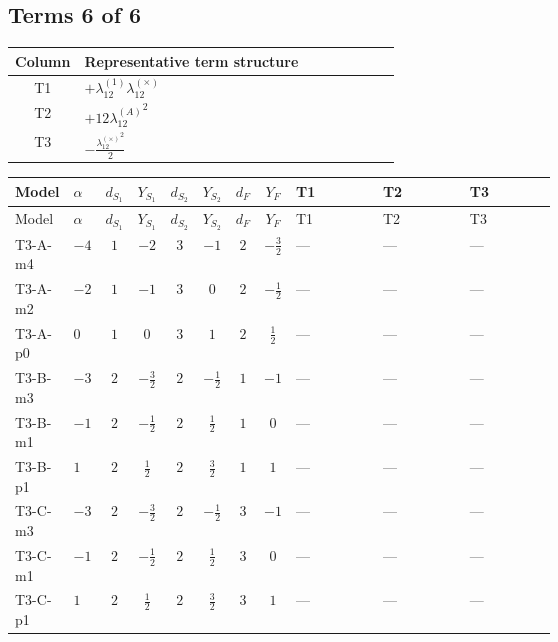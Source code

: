 \documentclass[8pt]{article}
\begin{document}
\begin{landscape}
\subsection*{Terms 6 of 6}
\begin{center}
\begin{tabular}{@{}c >{\raggedright\arraybackslash}p{0.82\linewidth}@{}}
\toprule
Column & Representative term structure \\
\midrule
T1 & \(\displaystyle +{\lambda_{12}^{(1)}} {\lambda_{12}^{(\times)}}\) \\
\midrule
T2 & \(\displaystyle +12 {\lambda_{12}^{(A)}}^2\) \\
\midrule
T3 & \(\displaystyle -\frac{{\lambda_{12}^{(\times)}}^2}{2}\) \\
\midrule
\bottomrule
\end{tabular}
\end{center}
\smallskip
\tiny
\begin{longtable}{@{}llcccccc >{\raggedright\arraybackslash}p{0.21\linewidth} >{\raggedright\arraybackslash}p{0.21\linewidth} >{\raggedright\arraybackslash}p{0.21\linewidth}@{}}
\toprule
Model & $\alpha$ & $d_{S_1}$ & $Y_{S_1}$ & $d_{S_2}$ & $Y_{S_2}$ & $d_F$ & $Y_F$ & T1 & T2 & T3 \\
\midrule
\endfirsthead
\toprule
Model & $\alpha$ & $d_{S_1}$ & $Y_{S_1}$ & $d_{S_2}$ & $Y_{S_2}$ & $d_F$ & $Y_F$ & T1 & T2 & T3 \\
\midrule
\endhead
T3-A-m4 & $-4$ & $1$ & $-2$ & $3$ & $-1$ & $2$ & $-\frac{3}{2}$ & --- & --- & --- \\
\midrule
T3-A-m2 & $-2$ & $1$ & $-1$ & $3$ & $0$ & $2$ & $-\frac{1}{2}$ & --- & --- & --- \\
\midrule
T3-A-p0 & $0$ & $1$ & $0$ & $3$ & $1$ & $2$ & $\frac{1}{2}$ & --- & --- & --- \\
\midrule
T3-B-m3 & $-3$ & $2$ & $-\frac{3}{2}$ & $2$ & $-\frac{1}{2}$ & $1$ & $-1$ & --- & --- & --- \\
\midrule
T3-B-m1 & $-1$ & $2$ & $-\frac{1}{2}$ & $2$ & $\frac{1}{2}$ & $1$ & $0$ & --- & --- & --- \\
\midrule
T3-B-p1 & $1$ & $2$ & $\frac{1}{2}$ & $2$ & $\frac{3}{2}$ & $1$ & $1$ & --- & --- & --- \\
\midrule
T3-C-m3 & $-3$ & $2$ & $-\frac{3}{2}$ & $2$ & $-\frac{1}{2}$ & $3$ & $-1$ & --- & --- & --- \\
\midrule
T3-C-m1 & $-1$ & $2$ & $-\frac{1}{2}$ & $2$ & $\frac{1}{2}$ & $3$ & $0$ & --- & --- & --- \\
\midrule
T3-C-p1 & $1$ & $2$ & $\frac{1}{2}$ & $2$ & $\frac{3}{2}$ & $3$ & $1$ & --- & --- & --- \\

\end{longtable}
\end{landscape}
\end{document}

